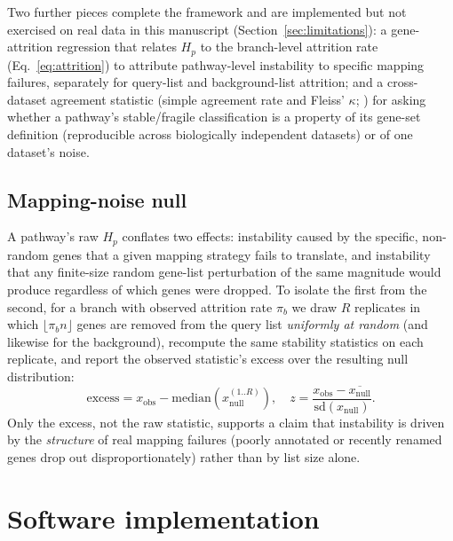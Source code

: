 \documentclass[webpdf,contemporary,large]{oup-authoring-template}
\theoremstyle{thmstyleone}%
\theoremstyle{thmstyletwo}%
\theoremstyle{thmstylethree}%
\begin{document}
Two further pieces complete the framework and are implemented but not exercised on real data in this manuscript (Section~\ref{sec:limitations}): a gene-attrition regression that relates $H_p$ to the branch-level attrition rate (Eq.~\ref{eq:attrition}) to attribute pathway-level instability to specific mapping failures, separately for query-list and background-list attrition; and a cross-dataset agreement statistic (simple agreement rate and Fleiss' $\kappa$; \citealp{fleiss1971kappa}) for asking whether a pathway's stable/fragile classification is a property of its gene-set definition (reproducible across biologically independent datasets) or of one dataset's noise.

\subsection{Mapping-noise null}\label{sec:null}

A pathway's raw $H_p$ conflates two effects: instability caused by the specific, non-random genes that a given mapping strategy fails to translate, and instability that any finite-size random gene-list perturbation of the same magnitude would produce regardless of which genes were dropped. To isolate the first from the second, for a branch with observed attrition rate $\pi_b$ we draw $R$ replicates in which $\lfloor \pi_b n\rfloor$ genes are removed from the query list \emph{uniformly at random} (and likewise for the background), recompute the same stability statistics on each replicate, and report the observed statistic's excess over the resulting null distribution:
\begin{equation}
\mathrm{excess} = x_{\mathrm{obs}} - \mathrm{median}(x_{\mathrm{null}}^{(1..R)}), \quad
z = \frac{x_{\mathrm{obs}}-\overline{x_{\mathrm{null}}}}{\mathrm{sd}(x_{\mathrm{null}})}.
\label{eq:excess}
\end{equation}
Only the excess, not the raw statistic, supports a claim that instability is driven by the \emph{structure} of real mapping failures (poorly annotated or recently renamed genes drop out disproportionately) rather than by list size alone.

\section{Software implementation}\label{sec:software}
\end{document}
